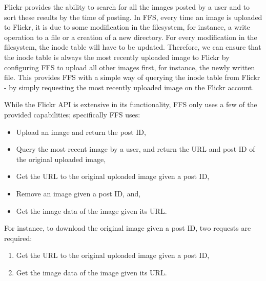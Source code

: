Flickr provides the ability to search for all the images posted by a user and to sort these results by the time of posting. In \gls{FFS}, every time an image is uploaded to Flickr, it is due to some modification in the filesystem, for instance, a write operation to a file or a creation of a new directory. For every modification in the filesystem, the inode table will have to be updated. Therefore, we can ensure that the inode table is always the most recently uploaded image to Flickr by configuring \gls{FFS} to upload all other images first, for instance, the newly written file. This provides \gls{FFS} with a simple way of querying the inode table from Flickr - by simply requesting the most recently uploaded image on the Flickr account.

While the Flickr \gls{API} is extensive in its functionality, \gls{FFS} only uses a few of the provided capabilities; specifically \gls{FFS} uses:
\begin{itemize}
	\item Upload an image and return the post ID,
	\item Query the most recent image by a user, and return the URL and post ID of the original uploaded image,
	\item Get the URL to the original uploaded image given a post ID,
	\item Remove an image given a post ID, and,
	\item Get the image data of the image given its URL.
\end{itemize}

For instance, to download the original image given a post ID, two requests are required:
\begin{enumerate}
	\item Get the URL to the original uploaded image given a post ID,
	\item Get the image data of the image given its URL.
\end{enumerate}

